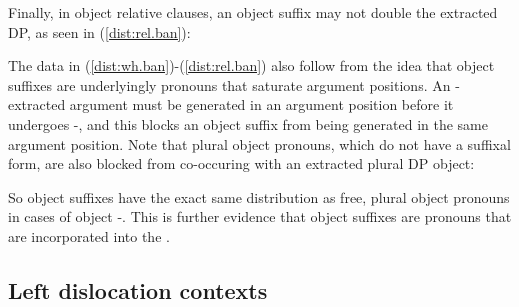 \documentclass[output=paper,
modfonts
]{langscibook}
\begin{document}
\noindent Finally, in object relative clauses, an object suffix may not double the extracted DP, as seen in (\ref{dist:rel.ban}):

\begin{exe}
\end{exe}

\noindent The data in (\ref{dist:wh.ban})-(\ref{dist:rel.ban}) also follow from the idea that object suffixes are underlyingly pronouns that saturate argument positions. An \abar-extracted argument must be generated in an argument position before it undergoes \abar-, and this blocks an object suffix from being generated in the same argument position. Note that plural object pronouns, which do not have a suffixal form, are also blocked from co-occuring with an extracted plural DP object:

\begin{exe}
\ex \label{dist:pl.ban}
\begin{xlista}

\end{xlista}
\end{exe}

\noindent So object suffixes have the exact same distribution as free, plural object pronouns in cases of object \abar-. This is further evidence that object suffixes are pronouns that are incorporated into the .

\subsection{Left dislocation contexts}\label{sec:baier:2.3}
\end{document}
